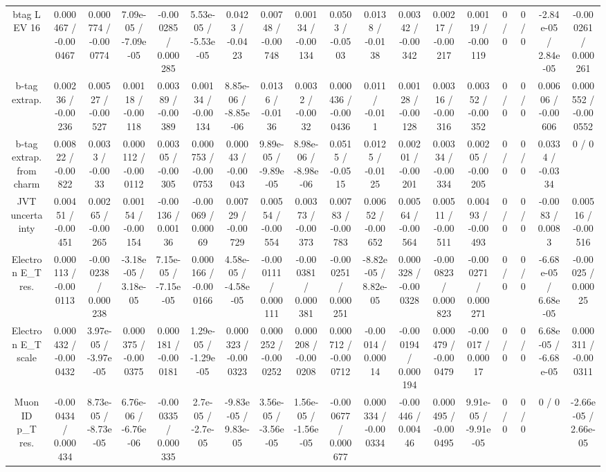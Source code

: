 \documentclass[10pt]{article}
\begin{document}
\begin{table}[htbp]
\begin{center}
\begin{tabular}{|c|c|c|c|c|c|c|c|c|c|c|c|c|c|c|c|c|c|}
  btag L EV 16 & 0.000467 / -0.000467 & 0.000774 / -0.000774 & 7.09e-05 / -7.09e-05 & -0.000285 / 0.000285 & 5.53e-05 / -5.53e-05 & 0.0423 / -0.0423 & 0.00748 / -0.00748 & 0.00134 / -0.00134 & 0.0503 / -0.0503 & 0.0138 / -0.0138 & 0.00342 / -0.00342 & 0.00217 / -0.00217 & 0.00119 / -0.00119 & 0 / 0 & 0 / 0 & -2.84e-05 / 2.84e-05 & -0.000261 / 0.000261 \\ 
  b-tag extrap. & 0.00236 / -0.00236 & 0.00527 / -0.00527 & 0.00118 / -0.00118 & 0.00389 / -0.00389 & 0.00134 / -0.00134 & 8.85e-06 / -8.85e-06 & 0.0136 / -0.0136 & 0.0032 / -0.0032 & 0.000436 / -0.000436 & 0.011 / -0.011 & 0.00128 / -0.00128 & 0.00316 / -0.00316 & 0.00352 / -0.00352 & 0 / 0 & 0 / 0 & 0.00606 / -0.00606 & 0.000552 / -0.000552 \\ 
  b-tag extrap. from charm & 0.00822 / -0.00822 & 0.0033 / -0.0033 & 0.000112 / -0.000112 & 0.00305 / -0.00305 & 0.000753 / -0.000753 & 0.00043 / -0.00043 & 9.89e-05 / -9.89e-05 & 8.98e-06 / -8.98e-06 & 0.0515 / -0.0515 & 0.0125 / -0.0125 & 0.00201 / -0.00201 & 0.00334 / -0.00334 & 0.00205 / -0.00205 & 0 / 0 & 0 / 0 & 0.0334 / -0.0334 & 0 / 0 \\ 
  JVT uncertainty & 0.00451 / -0.00451 & 0.00265 / -0.00265 & 0.00154 / -0.00154 & -0.00136 / 0.00136 & -0.00069 / 0.00069 & 0.00729 / -0.00729 & 0.00554 / -0.00554 & 0.00373 / -0.00373 & 0.00783 / -0.00783 & 0.00652 / -0.00652 & 0.00564 / -0.00564 & 0.00511 / -0.00511 & 0.00493 / -0.00493 & 0 / 0 & 0 / 0 & -0.0083 / 0.0083 & 0.00516 / -0.00516 \\ 
  Electron E_{T} res. & 0.000113 / -0.000113 & -0.000238 / 0.000238 & -3.18e-05 / 3.18e-05 & 7.15e-05 / -7.15e-05 & 0.000166 / -0.000166 & 4.58e-05 / -4.58e-05 & -0.000111 / 0.000111 & -0.000381 / 0.000381 & -0.000251 / 0.000251 & -8.82e-05 / 8.82e-05 & 0.000328 / -0.000328 & -0.000823 / 0.000823 & -0.000271 / 0.000271 & 0 / 0 & 0 / 0 & -6.68e-05 / 6.68e-05 & -0.00025 / 0.00025 \\ 
  Electron E_{T} scale & 0.000432 / -0.000432 & 3.97e-05 / -3.97e-05 & 0.000375 / -0.000375 & 0.000181 / -0.000181 & 1.29e-05 / -1.29e-05 & 0.000323 / -0.000323 & 0.000252 / -0.000252 & 0.000208 / -0.000208 & 0.000712 / -0.000712 & -0.00014 / 0.00014 & -0.000194 / 0.000194 & 0.000479 / -0.000479 & -0.00017 / 0.00017 & 0 / 0 & 0 / 0 & 6.68e-05 / -6.68e-05 & 0.000311 / -0.000311 \\ 
  Muon ID p_{T} res. & -0.000434 / 0.000434 & 8.73e-05 / -8.73e-05 & 6.76e-06 / -6.76e-06 & -0.000335 / 0.000335 & 2.7e-05 / -2.7e-05 & -9.83e-05 / 9.83e-05 & 3.56e-05 / -3.56e-05 & 1.56e-05 / -1.56e-05 & -0.000677 / 0.000677 & 0.000334 / -0.000334 & -0.00446 / 0.00446 & 0.000495 / -0.000495 & 9.91e-05 / -9.91e-05 & 0 / 0 & 0 / 0 & 0 / 0 & -2.66e-05 / 2.66e-05 \\ 

\end{tabular}
\end{center}
\end{table}
\end{document}
